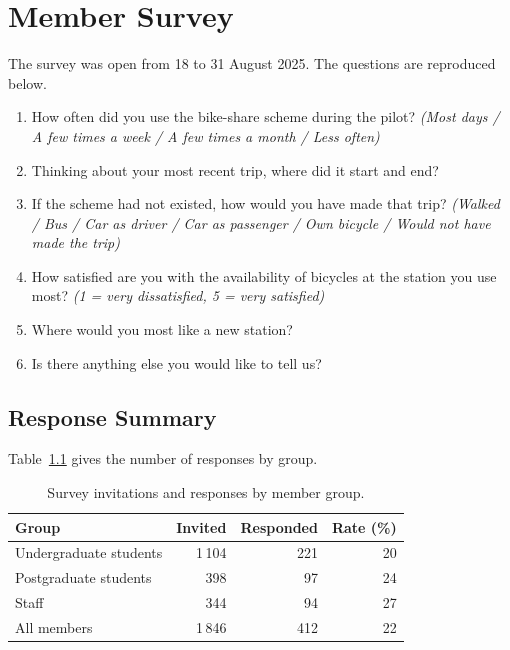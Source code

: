\chapter{Member Survey}\label{app:survey}

The survey was open from 18 to 31 August 2025. The questions are reproduced below.

\begin{enumerate}
  \item How often did you use the bike-share scheme during the pilot? \emph{(Most days / A few times a week / A few times a month / Less often)}
  \item Thinking about your most recent trip, where did it start and end?
  \item If the scheme had not existed, how would you have made that trip? \emph{(Walked / Bus / Car as driver / Car as passenger / Own bicycle / Would not have made the trip)}
  \item How satisfied are you with the availability of bicycles at the station you use most? \emph{(1 = very dissatisfied, 5 = very satisfied)}
  \item Where would you most like a new station?
  \item Is there anything else you would like to tell us?
\end{enumerate}

\section{Response Summary}
Table~\ref{tab:survey} gives the number of responses by group.

\begin{table}[htbp]
  \centering
  \caption{Survey invitations and responses by member group.}
  \label{tab:survey}
  \begin{tabular}{lrrr}
    \toprule
    Group & Invited & Responded & Rate (\%) \\
    \midrule
    Undergraduate students & 1\,104 & 221 & 20 \\
    Postgraduate students  &    398 &  97 & 24 \\
    Staff                  &    344 &  94 & 27 \\
    \midrule
    All members            & 1\,846 & 412 & 22 \\
    \bottomrule
  \end{tabular}
\end{table}
